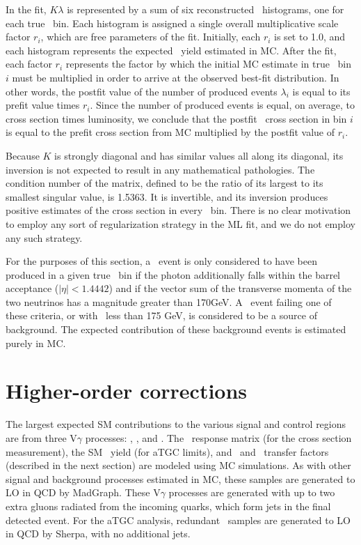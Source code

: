 In the fit, $K \lambda$ is represented by a sum of six reconstructed \ETgamma\ histograms, one for each true \pTgamma\ bin. Each histogram is assigned a single overall
multiplicative scale factor $r_{i}$, which are free parameters of the fit.
Initially, each $r_{i}$ is set to 1.0, and each histogram represents the expected \zinvg\ yield estimated in MC. After the fit, each factor $r_{i}$ represents the factor
by which the initial MC estimate in true \ETgamma\ bin $i$ must be multiplied in order to arrive at the observed best-fit distribution. In other words, the postfit value
of the number of produced events $\lambda_{i}$ is equal to its prefit value times $r_{i}$.
Since the number of produced events is equal, on average, to cross section times luminosity, we conclude that the postfit \zinvg\ cross
section in bin $i$ is equal to the prefit cross section from MC multiplied by the postfit value of $r_{i}$.

Because $K$ is strongly diagonal and has similar values all along its diagonal, its inversion is not expected to result in any mathematical pathologies.
The condition number of the matrix, defined to be the ratio of its largest to its smallest singular value, is 1.5363. It is invertible, and
its inversion produces positive estimates of the cross section in every \ETgamma\ bin. There is no clear motivation to employ any sort of regularization
strategy in the ML fit, and we do not employ any such strategy.

For the purposes of this section, a \zinvg\ event is only considered to
have been produced in a given true \pTgamma\ bin if the photon additionally falls within the barrel acceptance ($|\eta| < 1.4442$) and
if the vector sum of the transverse momenta of the two neutrinos has a magnitude greater than 170\unit{GeV}. A \zinvg\ event failing one of these
criteria, or with \ETgamma\ less than 175 GeV, is considered to be a source of background. The expected contribution of these background events is estimated
purely in MC.

\section{Higher-order corrections}
The largest expected SM contributions to the various signal and control regions are from three $\mathrm{V}\gamma$
processes: \zinvg, \wlng, and \zllg.
The \zinvg\ response matrix (for the cross section measurement), the SM \zinvg\ yield (for aTGC limits),
and \wlng\ and \zllg\ transfer factors (described in the next section) are modeled using MC simulations.
As with other signal and background processes estimated in MC, these samples are generated to LO in QCD by MadGraph.
These $\mathrm{V}\gamma$ processes are generated with up to two extra gluons radiated from the incoming quarks,
which form jets in the final detected event.
For the aTGC analysis, redundant \zinvg\ samples are generated to LO in QCD by Sherpa, with no additional jets.

